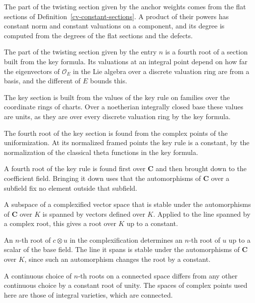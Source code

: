 The part of the twisting section given by the anchor weights comes from the flat sections of
Definition~\ref{cv-constant-sections}. A product of their powers has constant norm and constant
valuations on a component, and its degree is computed from the degrees of the flat sections and the
defects.

The part of the twisting section given by the entry $n$ is a fourth root of a section built from the key
formula. Its valuations at an integral point depend on how far the eigenvectors of $\mathcal O_E$ in the
Lie algebra over a discrete valuation ring are from a basis, and the different of $E$ bounds this.

The key section is built from the values of the key rule on families over the coordinate rings of charts.
Over a noetherian integrally closed base these values are units, as they are over every discrete valuation
ring by the key formula.

The fourth root of the key section is found from the complex points of the uniformization. At its normalized
framed points the key rule is a constant, by the normalization of the classical theta functions in the key
formula.

A fourth root of the key rule is found first over $\mathbf C$ and then brought down to the coefficient field.
Bringing it down uses that the automorphisms of $\mathbf C$ over a subfield fix no element outside that
subfield.

A subspace of a complexified vector space that is stable under the automorphisms of $\mathbf C$ over $K$ is
spanned by vectors defined over $K$. Applied to the line spanned by a complex root, this gives a root over $K$
up to a constant.

An $n$-th root of $c\otimes u$ in the complexification determines an $n$-th root of $u$ up to a scalar of the
base field. The line it spans is stable under the automorphisms of $\mathbf C$ over $K$, since such an
automorphism changes the root by a constant.

A continuous choice of $n$-th roots on a connected space differs from any other continuous choice by a
constant root of unity. The spaces of complex points used here are those of integral varieties, which are
connected.

